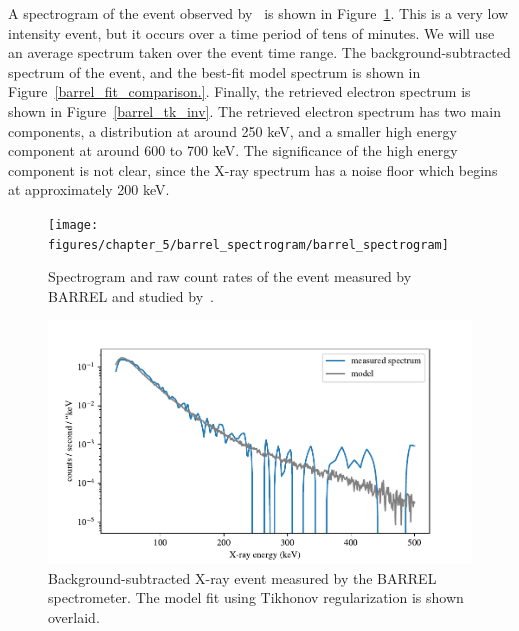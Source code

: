 A spectrogram of the event observed by~\citet{Halford2015} is shown in Figure~\ref{barrel_spectrogram}. This is a very low intensity event, but it occurs over a time period of tens of minutes. We will use an average spectrum taken over the event time range. The background-subtracted spectrum of the event, and the best-fit model spectrum is shown in Figure~\ref{barrel_fit_comparison.}. Finally, the retrieved electron spectrum is shown in Figure~\ref{barrel_tk_inv}. The retrieved electron spectrum has two main components, a distribution at around 250 keV, and a smaller high energy component at around 600 to 700 keV. The significance of the high energy component is not clear, since the X-ray spectrum has a noise floor which begins at approximately 200 keV. 

\begin{figure}[p]
    \centering
    \texttt{[image: figures/chapter\_5/barrel\_spectrogram/barrel\_spectrogram]}
    \caption{Spectrogram and raw count rates of the event measured by BARREL and studied by~\citet{Halford2015}.}
    \label{barrel_spectrogram}
\end{figure}

\begin{figure}[p]
    \centering
    \includegraphics[width=1.0\textwidth]{figures/chapter_5/barrel_fit_comparison/barrel_fit_comparison}
    \caption{Background-subtracted X-ray event measured by the BARREL spectrometer. The model fit using Tikhonov regularization is shown overlaid.}
    \label{barrel_fit_comparison}
\end{figure}

